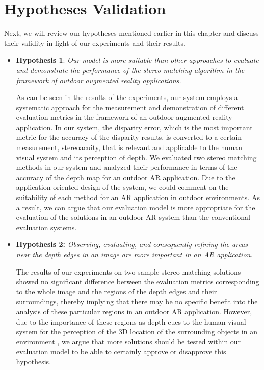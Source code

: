 \section{Hypotheses Validation}
Next, we will review our hypotheses mentioned earlier in this chapter and discuss their validity in light of our experiments and their results.

\begin{itemize}
\item \textbf{Hypothesis 1}: \emph{Our model is more suitable than other approaches to evaluate and demonstrate
the performance of the stereo matching algorithm in the framework of 
outdoor augmented reality applications.} 

As can be seen in the results of the experiments, our system employs a systematic approach for the measurement and demonstration of different 
evaluation metrics in the framework of an outdoor augmented reality application. 
In our system, the disparity error, which is the most important metric for the accuracy of the disparity results, 
is converted to a certain measurement, stereoacuity, that is relevant and applicable to the human visual
system and its perception of depth. We evaluated two stereo matching methods in our system and analyzed their performance in terms of
the accuracy of the depth map for an outdoor AR application. Due to the application-oriented design of the system, we could comment on the suitability of each method
for an AR application in outdoor environments. As a result, we can argue that our evaluation model is more appropriate for the evaluation of the solutions 
in an outdoor AR system than the conventional evaluation systems.

\item \textbf{Hypothesis 2:} \emph{Observing, evaluating, and consequently 
refining the areas near the depth edges in an image are more important in an AR application.}

The results of our experiments on two sample stereo matching solutions showed no significant difference between the evaluation metrics corresponding to the whole image and
the regions of the depth edges and their surroundings, thereby implying that there may be no specific benefit into the analysis of these particular regions 
in an outdoor AR application.
However, due to the importance of these regions as depth cues to the human visual system for the perception of the 3D location of the surrounding 
objects in an environment \cite{sze11}, we argue that more solutions should be tested within our evaluation model 
to be able to certainly approve or disapprove this hypothesis. 


\end{itemize}
